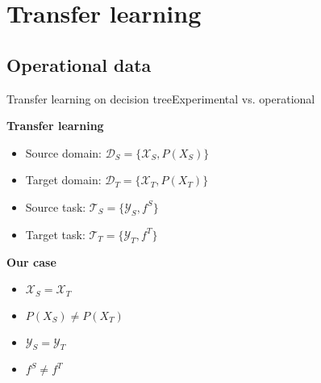 \section{Transfer learning}
\subsection{Operational data}
\begin{frame}{Transfer learning on decision tree}{Experimental vs. operational}
\begin{minipage}[t]{0.49\linewidth}
    \vspace{0pt}
    \textbf{Transfer learning}
    \begin{itemize}
        \item Source domain: $\mathcal{D}_{S} = \{\mathcal{X}_{S}, P(X_{S})\}$\\
        \item Target domain: $\mathcal{D}_{T} = \{\mathcal{X}_{T}, P(X_{T})\}$\\
        \item Source task: $\mathcal{T}_{S} = \{\mathcal{Y}_{S}, f^S\}$\\
        \item Target task: $\mathcal{T}_{T} = \{\mathcal{Y}_{T}, f^T\}$\\
    \end{itemize}
\end{minipage}
\begin{minipage}[t]{0.49\linewidth}
    \vspace{0pt}
    \textbf{Our case}
    \begin{itemize}%
        \item $\mathcal{X}_{S} = \mathcal{X}_{T}$
        \item \textcolor{myorange}{$P(X_{S}) \neq P(X_{T})$}
        \item $\mathcal{Y}_{S} = \mathcal{Y}_{T}$
        \item \textcolor{myorange}{$f^S \neq f^T$}
    \end{itemize}
\end{minipage}

\bigskip


\end{frame}
